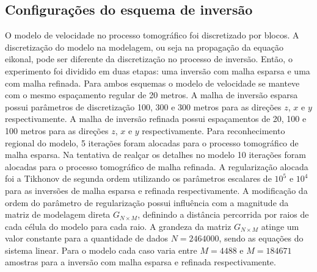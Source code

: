 \subsection*{Configurações do esquema de inversão}

O modelo de velocidade no processo tomográfico foi discretizado por blocos. A discretização do modelo na modelagem, ou seja na propagação da equação eikonal, pode ser diferente da discretização no processo de inversão. Então, o experimento foi dividido em duas etapas: uma inversão com malha esparsa e uma com malha refinada. Para ambos esquemas o modelo de velocidade se manteve com o mesmo espaçamento regular de 20 metros. A malha de inversão esparsa possui parâmetros de discretização 100, 300 e 300 metros para as direções $z$, $x$ e $y$ respectivamente. A malha de inversão refinada possui espaçamentos de 20, 100 e 100 metros para as direções $z$, $x$ e $y$ respectivamente. Para reconhecimento regional do modelo, 5 iterações foram alocadas para o processo tomográfico de malha esparsa. Na tentativa de realçar os detalhes no modelo 10 iterações foram alocadas para o processo tomográfico de malha refinada. A regularização alocada foi a Tikhonov de segunda ordem utilizando os parâmetros escalares de $10^5$ e $10^4$ para as inversões de malha esparsa e refinada respectivamente. A modificação da ordem do parâmetro de regularização possui influência com a magnitude da matriz de modelagem direta $G_{N\times M}$, definindo a distância percorrida por raios de cada célula do modelo para cada raio. A grandeza da matriz $G_{N\times M}$ atinge um valor constante para a quantidade de dados $N = 2464000$, sendo as equações do sistema linear. Para o modelo cada caso varia entre $M = 4488$ e $M = 184671$ amostras para a inversão com malha esparsa e refinada respectivamente.   







